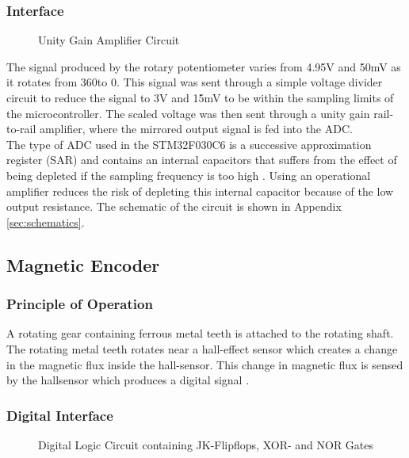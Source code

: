 \subsubsection{Interface}
\begin{figure}[h]
	\centering
	
	\caption{Unity Gain Amplifier Circuit}
	\label{fig:unitygain}
\end{figure}
The signal produced by the rotary potentiometer varies from 4.95V and 50mV as it rotates from 360\textdegree \space to 0\textdegree. This signal was sent through a simple voltage divider circuit to reduce the signal to 3V and 15mV to be within the sampling limits of the microcontroller. The scaled voltage was then sent through a unity gain rail-to-rail amplifier, where the mirrored output signal is fed into the ADC.\\

The type of ADC used in the STM32F030C6 is a successive approximation register (SAR) and contains an internal capacitors that suffers from the effect of being depleted if the sampling frequency is too high \citep{stm32_ADC:2017}. Using an operational amplifier reduces the risk of depleting this internal capacitor because of the low output resistance. The schematic of the circuit is shown in Appendix \ref{sec:schematics}.\\

\subsection{Magnetic Encoder}
\subsubsection{Principle of Operation}
A rotating gear containing ferrous metal teeth is attached to the rotating shaft. The rotating metal teeth rotates near a hall-effect sensor which creates a change in the magnetic flux inside the hall-sensor. This change in magnetic flux is sensed by the hallsensor which produces a digital signal \citep{hallsensor}.
\subsubsection{Digital Interface} 

\begin{figure}[h]
	\centering
	
	\caption{Digital Logic Circuit containing JK-Flipflops, XOR- and NOR Gates}
	\label{fig:jk_xor}
\end{figure}

